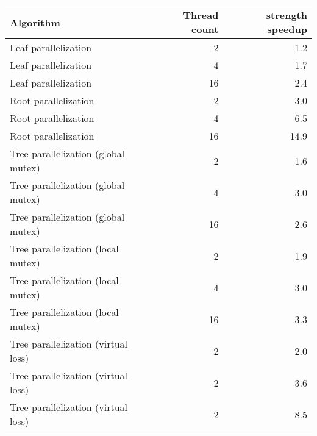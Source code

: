 \begin{tabular}{lrr}
\hline
Algorithm & Thread count & strength speedup\\
\hline
Leaf parallelization & 2  & 1.2\\
Leaf parallelization & 4  & 1.7\\
Leaf parallelization & 16 & 2.4\\
\hline
Root parallelization & 2  & 3.0\\
Root parallelization & 4  & 6.5\\
Root parallelization & 16 & 14.9\\
\hline
Tree parallelization (global mutex) & 2  & 1.6\\
Tree parallelization (global mutex) & 4  & 3.0\\
Tree parallelization (global mutex) & 16 & 2.6\\
\hline
Tree parallelization (local mutex) & 2  & 1.9\\
Tree parallelization (local mutex) & 4  & 3.0\\
Tree parallelization (local mutex) & 16 & 3.3\\
\hline
Tree parallelization (virtual loss) & 2  & 2.0\\
Tree parallelization (virtual loss) & 2  & 3.6\\
Tree parallelization (virtual loss) & 2  & 8.5\\
\hline
\end{tabular}









